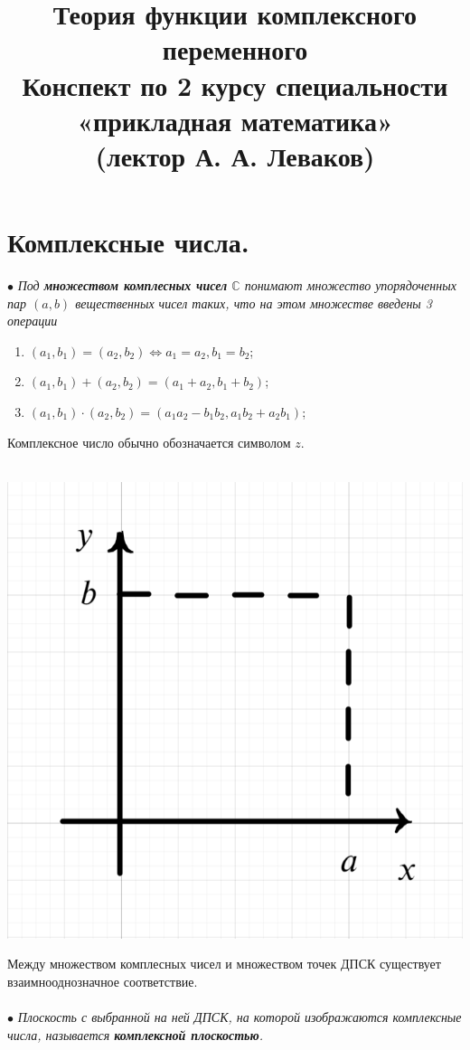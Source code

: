 \documentclass[a4paper, 12pt]{article}
\title{\vspace{6.5cm}\textbf{\Huge{Теория функции комплексного переменного}}\\Конспект по 2 курсу 
	специальности «прикладная математика»\\(лектор А. А. Леваков)}
\date{}
\newcommand{\Cm}{\mathbb{C}}
\begin{document}
	\maketitle
		\newpage
	\tableofcontents{}
	\newpage
	\section{Комплексные числа.}
	$\bullet$ \textit{Под \textbf{множеством комплесных чисел} $\Cm$ понимают множество упорядоченных пар $(a,b)$ вещественных чисел таких, что на этом множестве введены 3 операции}\begin{enumerate}
		\item $(a_1,b_1) = (a_2,b_2) \Longleftrightarrow a_1 = a_2, b_1 = b_2$;
		\item $(a_1,b_1) + (a_2, b_2) = (a_1+a_2, b_1 + b_2)$;
		\item $(a_1, b_1)\cdot (a_2,b_2) = (a_1a_2 - b_1b_2, a_1b_2 + a_2b_1)$;
	\end{enumerate}
Комплексное число обычно обозначается символом $z$.\\\\
\noindent
\parbox[b][3.5cm][t]{10mm}{
	\includegraphics[scale=0.25]{images/001.png}}
\hfill
\parbox[b][2.75cm][t]{115mm}{
Между множеством комплесных чисел и множеством точек ДПСК существует взаимнооднозначное соответствие.\\\\
$\bullet$ \textit{Плоскость с выбранной на ней ДПСК, на которой изображаются комплексные числа, называется \textbf{комплексной плоскостью}.}}\\\\
\end{document}
